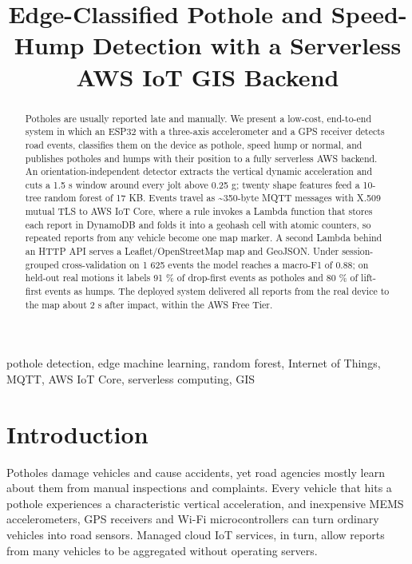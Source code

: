 \documentclass[conference]{IEEEtran}
\begin{document}
\title{Edge-Classified Pothole and Speed-Hump Detection with a Serverless AWS IoT GIS Backend}

\author{\IEEEauthorblockA{\textit{[Department], [Institution]}\\ \textit{[City], [Country]}\\ [email]}}

\maketitle

\begin{abstract}
Potholes are usually reported late and manually. We present a low-cost, end-to-end system in which an ESP32 with a three-axis accelerometer and a GPS receiver detects road events, classifies them on the device as pothole, speed hump or normal, and publishes potholes and humps with their position to a fully serverless AWS backend. An orientation-independent detector extracts the vertical dynamic acceleration and cuts a 1.5 s window around every jolt above 0.25 g; twenty shape features feed a 10-tree random forest of 17 KB. Events travel as \textasciitilde{}350-byte MQTT messages with X.509 mutual TLS to AWS IoT Core, where a rule invokes a Lambda function that stores each report in DynamoDB and folds it into a geohash cell with atomic counters, so repeated reports from any vehicle become one map marker. A second Lambda behind an HTTP API serves a Leaflet/OpenStreetMap map and GeoJSON. Under session-grouped cross-validation on 1 625 events the model reaches a macro-F1 of 0.88; on held-out real motions it labels 91 \% of drop-first events as potholes and 80 \% of lift-first events as humps. The deployed system delivered all reports from the real device to the map about 2 s after impact, within the AWS Free Tier.
\end{abstract}

\begin{IEEEkeywords}
pothole detection, edge machine learning, random forest, Internet of Things, MQTT, AWS IoT Core, serverless computing, GIS
\end{IEEEkeywords}

\section{Introduction}
Potholes damage vehicles and cause accidents, yet road agencies mostly learn about them from manual inspections and complaints. Every vehicle that hits a pothole experiences a characteristic vertical acceleration, and inexpensive MEMS accelerometers, GPS receivers and Wi-Fi microcontrollers can turn ordinary vehicles into road sensors. Managed cloud IoT services, in turn, allow reports from many vehicles to be aggregated without operating servers.
\end{document}
